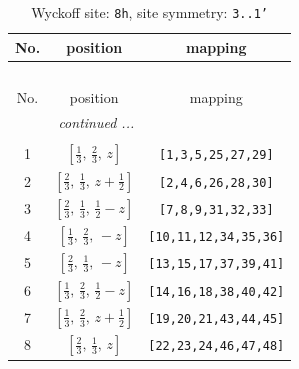 \documentclass[fleqn,8pt]{jsarticle}
\begin{document}
\begin{longtable}{ccc}
\caption{Wyckoff site: {\tt 8h}, site symmetry: {\tt 3..1'}}
 \\
 \hline \hline
No. & position & mapping \\ \hline \endfirsthead

\multicolumn{2}{l}{\tablename\ \thetable{}} \\
 \hline \hline
No. & position & mapping \\ \hline \endhead

 \hline \hline
\multicolumn{2}{r}{\footnotesize\it continued ...} \\ \endfoot

 \hline \hline
\multicolumn{2}{r}{} \\ \endlastfoot

1 & $\left[ \frac{1}{3},\, \frac{2}{3},\, z \right]$ & {\tt [1,3,5,25,27,29]} \\ \hline
2 & $\left[ \frac{2}{3},\, \frac{1}{3},\, z + \frac{1}{2} \right]$ & {\tt [2,4,6,26,28,30]} \\ \hline
3 & $\left[ \frac{2}{3},\, \frac{1}{3},\, \frac{1}{2} - z \right]$ & {\tt [7,8,9,31,32,33]} \\ \hline
4 & $\left[ \frac{1}{3},\, \frac{2}{3},\, - z \right]$ & {\tt [10,11,12,34,35,36]} \\ \hline
5 & $\left[ \frac{2}{3},\, \frac{1}{3},\, - z \right]$ & {\tt [13,15,17,37,39,41]} \\ \hline
6 & $\left[ \frac{1}{3},\, \frac{2}{3},\, \frac{1}{2} - z \right]$ & {\tt [14,16,18,38,40,42]} \\ \hline
7 & $\left[ \frac{1}{3},\, \frac{2}{3},\, z + \frac{1}{2} \right]$ & {\tt [19,20,21,43,44,45]} \\ \hline
8 & $\left[ \frac{2}{3},\, \frac{1}{3},\, z \right]$ & {\tt [22,23,24,46,47,48]} \\
\end{longtable}
\renewcommand{\arraystretch}{1.2}
\end{document}
